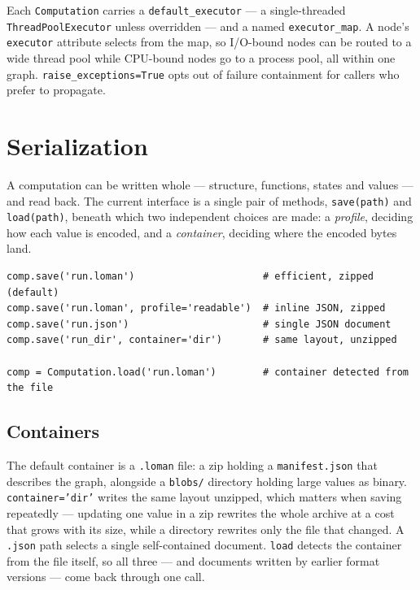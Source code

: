 \documentclass[11pt,a4paper]{article}
\newcommand{\code}[1]{\texttt{#1}}
\begin{document}
Each \code{Computation} carries a \code{default\_executor} --- a
single-threaded \code{ThreadPoolExecutor} unless overridden --- and a named
\code{executor\_map}. A node's \code{executor} attribute selects from the map,
so I/O-bound nodes can be routed to a wide thread pool while CPU-bound nodes
go to a process pool, all within one graph. \code{raise\_exceptions=True} opts
out of failure containment for callers who prefer to propagate.

\section{Serialization}\label{sec:serial}

A computation can be written whole --- structure, functions, states and
values --- and read back. The current interface is a single pair of methods,
\code{save(path)} and \code{load(path)}, beneath which two independent choices
are made: a \emph{profile}, deciding how each value is encoded, and a
\emph{container}, deciding where the encoded bytes land.

\begin{lstlisting}
comp.save('run.loman')                      # efficient, zipped (default)
comp.save('run.loman', profile='readable')  # inline JSON, zipped
comp.save('run.json')                       # single JSON document
comp.save('run_dir', container='dir')       # same layout, unzipped

comp = Computation.load('run.loman')        # container detected from the file
\end{lstlisting}

\subsection{Containers}

The default container is a \code{.loman} file: a zip holding a
\code{manifest.json} that describes the graph, alongside a \code{blobs/}
directory holding large values as binary. \code{container='dir'} writes the same
layout unzipped, which matters when saving repeatedly --- updating one value in
a zip rewrites the whole archive at a cost that grows with its size, while a
directory rewrites only the file that changed. A \code{.json} path selects a
single self-contained document. \code{load} detects the container from the file
itself, so all three --- and documents written by earlier format versions ---
come back through one call.
\end{document}
